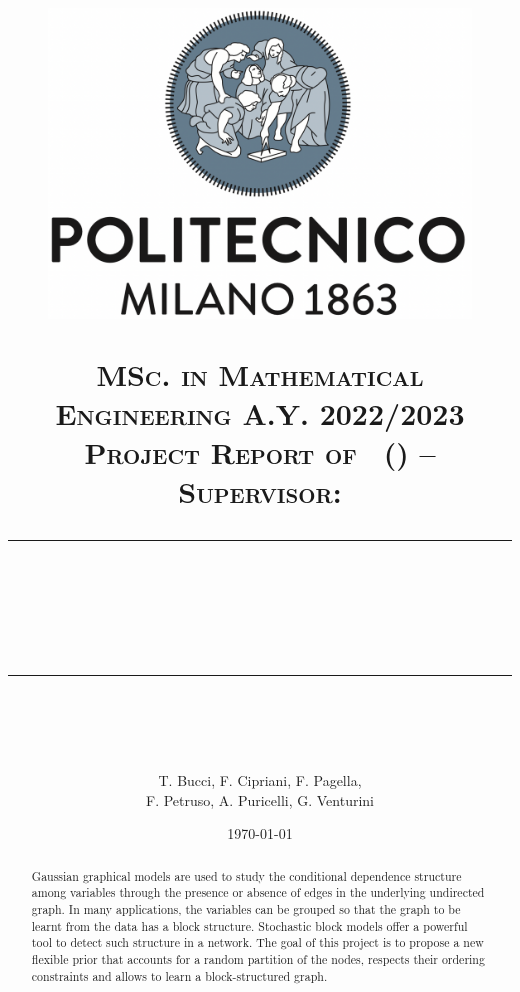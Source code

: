 \documentclass{article}
\title{
    \begin{figure}[htpb]
        \centering
        \includegraphics[scale=0.2]{images/logo-polimi}
    \end{figure}
    \normalfont \normalsize 
    \textsc{MSc. in Mathematical Engineering A.Y. 2022/2023\\ 
    Project Report of \coursename\ (\coursecode) -- \courseprof \\
    Supervisor: \coursesupervisor} \\
    [10pt] 
    \rule{\linewidth}{0.5pt} \\ [6pt] 
    \huge \papertitle \\
    \rule{\linewidth}{2pt}  \\ [10pt]
}
\author{T. Bucci, F. Cipriani, F. Pagella,\\ F. Petruso, A. Puricelli, G. Venturini}
\date{\normalsize \today}
\begin{document}
\maketitle


\begin{abstract} %
Gaussian graphical models are used to study the conditional dependence structure among variables through the presence or absence of edges in the underlying undirected graph. In many applications, the variables can be grouped so that the graph to be learnt from the data has a block structure. Stochastic block models offer a powerful tool to detect such structure in a network. The goal of this project is to propose a new flexible prior that accounts for a random partition of the nodes, respects their ordering constraints and allows to learn a block-structured graph.
\end{abstract}

\setlength{\columnsep}{0.8cm}
    


% 

\nocite{*}
\printbibliography
\end{document}
